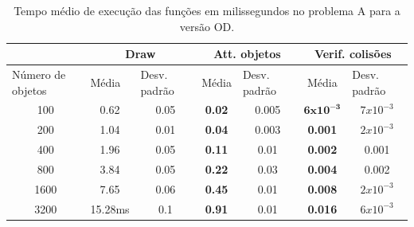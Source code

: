\begin{table}[h!]
\centering
\caption{Tempo médio de execução das funções em milissegundos no problema A para a versão OD.}
\label{dodv1table}
\begin{tabular}{c|cc|cc|cc}
\cline{2-7}
                                       & \multicolumn{2}{c|}{Draw}                                     & \multicolumn{2}{c|}{Att. objetos}                              & \multicolumn{2}{c}{Verif. colisões}                \\ \hline
\multicolumn{1}{l|}{Número de objetos} & \multicolumn{1}{l}{Média} & \multicolumn{1}{l|}{Desv. padrão} & \multicolumn{1}{l}{Média} & \multicolumn{1}{l|}{Desv. padrão} & Média           & \multicolumn{1}{l}{Desv. padrão} \\ \hline
100                                     & 0.62                       & 0.05                              & \textbf{0.02}              & 0.005                             & $\bm{6 x 10^{-3}}$   & $7 x 10^{-3}$                      \\ \hline
200                                     & 1.04                       & 0.01                              & \textbf{0.04}              & 0.003                             & \textbf{0.001}           & $2 x 10^{-3}$                      \\ \hline
400                                     & 1.96                       & 0.05                              & \textbf{0.11}              & 0.01                              & \textbf{0.002}           & 0.001                              \\ \hline
800                                     & 3.84                       & 0.05                              & \textbf{0.22}              & 0.03                              & \textbf{0.004}           & 0.002                              \\ \hline
1600                                    & 7.65                       & 0.06                              & \textbf{0.45}              & 0.01                              & \textbf{0.008}           & $2 x 10^{-3}$                      \\ \hline
3200                                    & 15.28ms                    & 0.1                               & \textbf{0.91}              & 0.01                              & \textbf{0.016}           & $6 x 10^{-3}$                      \\ \hline
\end{tabular}
\end{table}

